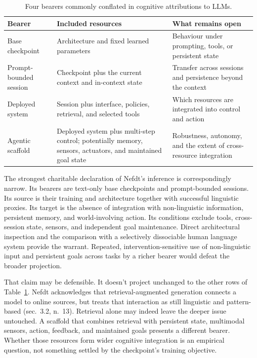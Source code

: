 \documentclass[12pt]{article}
\begin{document}
\begin{table}[ht]
\centering
\small
\begin{tabular}{>{\raggedright\arraybackslash}p{.20\linewidth}>{\raggedright\arraybackslash}p{.33\linewidth}>{\raggedright\arraybackslash}p{.34\linewidth}}
\toprule
Bearer & Included resources & What remains open \\
\midrule
Base checkpoint & Architecture and fixed learned parameters & Behaviour under prompting, tools, or persistent state \\
Prompt-bounded session & Checkpoint plus the current context and in-context state & Transfer across sessions and persistence beyond the context \\
Deployed system & Session plus interface, policies, retrieval, and selected tools & Which resources are integrated into control and action \\
Agentic scaffold & Deployed system plus multi-step control; potentially memory, sensors, actuators, and maintained goal state & Robustness, autonomy, and the extent of cross-resource integration \\
\bottomrule
\end{tabular}
\caption{Four bearers commonly conflated in cognitive attributions to LLMs.}
\label{tab:bearers}
\end{table}

The strongest charitable declaration of Nefdt's inference is correspondingly narrow. Its bearers are text-only base checkpoints and prompt-bounded sessions. Its source is their training and architecture together with successful linguistic proxies. Its target is the absence of integration with non-linguistic information, persistent memory, and world-involving action. Its conditions exclude tools, cross-session state, sensors, and independent goal maintenance. Direct architectural inspection and the comparison with a selectively dissociable human language system provide the warrant. Repeated, intervention-sensitive use of non-linguistic input and persistent goals across tasks by a richer bearer would defeat the broader projection.

That claim may be defensible. It doesn't project unchanged to the other rows of Table~\ref{tab:bearers}. Nefdt acknowledges that retrieval-augmented generation connects a model to online sources, but treats that interaction as still linguistic and pattern-based (sec.~3.2, n.~13). Retrieval alone may indeed leave the deeper issue untouched. A scaffold that combines retrieval with persistent state, multimodal sensors, action, feedback, and maintained goals presents a different bearer. Whether those resources form wider cognitive integration is an empirical question, not something settled by the checkpoint's training objective.
\end{document}
